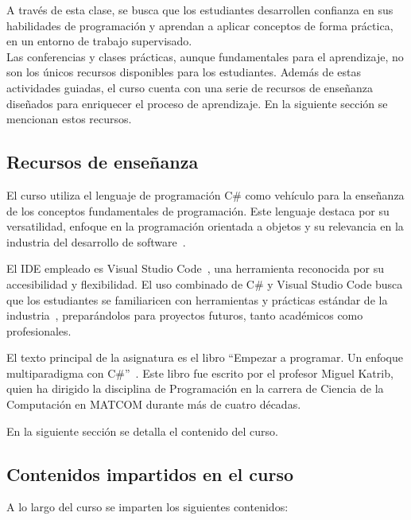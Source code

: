 \documentclass{article}
\begin{document}
A través de esta clase, se busca que los estudiantes desarrollen confianza en sus habilidades de programación y aprendan a aplicar conceptos de forma práctica, en un entorno de trabajo supervisado.\\

Las conferencias y clases prácticas, aunque fundamentales para el aprendizaje, no son los únicos recursos disponibles para los estudiantes. Además de estas actividades guiadas, el curso cuenta con una serie de recursos de enseñanza diseñados para enriquecer el proceso de aprendizaje. En la siguiente sección se mencionan estos recursos.

\subsection{Recursos de enseñanza}

El curso utiliza el lenguaje de programación C\# como vehículo para la enseñanza de los conceptos fundamentales de programación. Este lenguaje destaca por su versatilidad, enfoque en la programación orientada a objetos y su relevancia en la industria del desarrollo de software~\cite{microsoft-docs, Albahari2017, Troelsen2021}.

El IDE empleado es Visual Studio Code~\cite{vscode}, una herramienta reconocida por su accesibilidad y flexibilidad. El uso combinado de C\# y Visual Studio Code busca que los estudiantes se familiaricen con herramientas y prácticas estándar de la industria~\cite{microsoft-docs}, preparándolos para proyectos futuros, tanto académicos como profesionales.

El texto principal de la asignatura es el libro ``Empezar a programar. Un enfoque multiparadigma con C\#''~\cite{katrib_programar}. Este libro fue escrito por el profesor Miguel Katrib, quien ha dirigido la disciplina de Programación en la carrera de Ciencia de la Computación en \mbox{MATCOM} durante más de cuatro décadas.

En la siguiente sección se detalla el contenido del curso.

\subsection{Contenidos impartidos en el curso}  

A lo largo del curso se imparten los siguientes contenidos:
\end{document}
